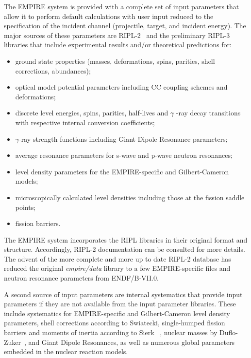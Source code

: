 The EMPIRE system is provided with a complete set of input parameters that
allow it to perform default calculations with user input reduced to the
specification of the incident channel (projectile, target, and incident
energy). The major sources of these parameters are RIPL-2~\cite{RIPL2} and
the preliminary RIPL-3 libraries that include experimental results and/or
theoretical predictions for:

\begin{itemize}
\item ground state properties (masses, deformations, spins, parities, shell
corrections, abundances);

\item optical model potential parameters including CC coupling schemes and
deformations;

\item discrete level energies, spins, parities, half-lives and $\gamma$%
-ray decay transitions with respective internal conversion coefficients;

\item $\gamma$-ray strength functions including Giant Dipole Resonance
  parameters;

\item average resonance parameters for s-wave and p-wave neutron resonances;

\item level density parameters for the EMPIRE-specific and Gilbert-Cameron models;

\item microscopically calculated level densities including those at
  the fission saddle points;

\item fission barriers.
\end{itemize}

The EMPIRE system incorporates the RIPL libraries in their original format and
structure. Accordingly, RIPL-2 documentation can be consulted for more
details. The advent of the more complete and more up to date RIPL-2 database
has reduced the original \emph{empire/data} library to a few EMPIRE-specific
files and neutron resonance parameters from ENDF/B-VII.0.

A second source of input parameters are internal systematics that provide
input parameters if they are not available from the input parameter
libraries. These include systematics for EMPIRE-specific and Gilbert-Cameron
level density parameters, shell corrections according to Swiatecki,
single-humped fission barriers and moments of inertia according to Sierk~%
\cite{sierk}, nuclear masses by Duflo-Zuker~\cite{Duflo:96}, and Giant
Dipole Resonances, as well as numerous global parameters embedded in the
nuclear reaction models.

